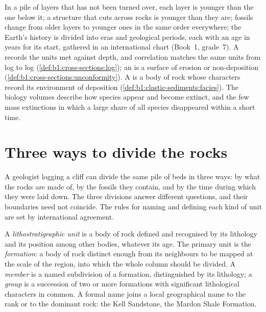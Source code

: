 \begin{recall}
In a pile of layers that has not been turned over, each layer is younger than
the one below it; a structure that cuts across rocks is younger than they are;
fossils change from older layers to younger ones in the same order everywhere;
the Earth's history is divided into eras and geological periods, each with an
age in years for its start, gathered in an international chart (Book~1,
grade~7). A  records the units met against depth, and correlation
matches the same units from log to log (\cref{def:b1:cross-sections:log}); an
 is a surface of erosion or non-deposition
(\cref{def:b1:cross-sections:unconformity}). A  is a body of
rock whose characters record its environment of deposition
(\cref{def:b1:clastic-sediments:facies}). The biology volumes describe how
species appear and become extinct, and the few mass extinctions in which a large
share of all species disappeared within a short time.
\end{recall}

\section{Three ways to divide the rocks}\label{sec:b1:stratigraphic-scale:three}

A geologist logging a cliff can divide the same pile of beds in three ways: by
what the rocks are made of, by the fossils they contain, and by the time during
which they were laid down. The three divisions answer different questions, and
their boundaries need not coincide. The rules for naming and defining each kind
of unit are set by international agreement.

\begin{definition}\label{def:b1:stratigraphic-scale:lithostratigraphy}
A \emph{lithostratigraphic unit} is a body of
rock defined and recognised by its lithology and its position among other
bodies, whatever its age. The primary unit is the
\emph{formation}: a body of rock distinct
enough from its neighbours to be mapped at the scale of the region, into which
the whole column should be divided. A \emph{member} is a named subdivision of a formation, distinguished by its
lithology; a \emph{group} is a succession of
two or more formations with significant lithological characters in common. A
formal name joins a local geographical name to the rank or to the dominant rock:
the Kell Sandstone, the Mardon Shale Formation.
\end{definition}

